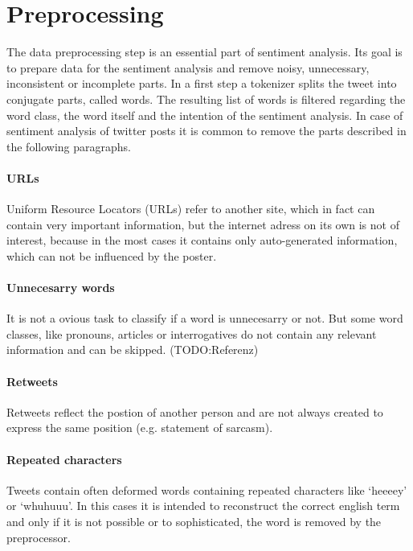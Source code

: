 \section{Preprocessing}
The data preprocessing step is an essential 
part of sentiment analysis. Its goal is to prepare data
for the sentiment analysis and remove noisy, unnecessary, 
inconsistent or incomplete parts.\autocite{Hemalatha2012}
In a first step a tokenizer splits the tweet into conjugate parts, called words. 
The resulting list of words is filtered regarding the word class, 
the word itself and the intention of the sentiment analysis. 
In case of sentiment analysis of twitter posts it is common to 
remove the parts described in the following paragraphs.\autocite{Hemalatha2012}

\paragraph{URLs}
Uniform Resource Locators (URLs) refer to another site, which 
in fact can contain very important information, but the internet adress 
on its own is not of interest, because in the most cases it 
contains only auto-generated information, which can not be influenced 
by the poster.

\paragraph{Unnecesarry words}
It is not a ovious task to classify if a word is unnecesarry 
or not. But some word classes, like pronouns, articles or interrogatives
do not contain any relevant information and can be skipped. (TODO:Referenz)

\paragraph{Retweets}
Retweets reflect the postion of another person and are not always
created to express the same position (e.g. statement of sarcasm).

\paragraph{Repeated characters}
Tweets contain often deformed words 
containing repeated characters like `heeeey' or
`whuhuuu'. In this cases it is intended to reconstruct 
the correct english term and only if it is not 
possible or to sophisticated, the word is removed 
by the preprocessor.


